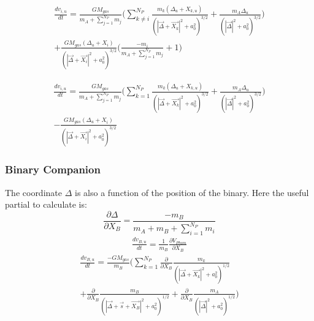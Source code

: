 \documentclass{aastex631}
\begin{document}
\begin{equation}
    \begin{split}
      \frac{dv_{i,u}}{dt} = 
      \frac{GM_{gas}}{m_A+\sum_{j=1}^{N_P}m_j}\biggl(\sum_{k\neq i}^{N_P}\frac{m_k(\Delta_u+X_{k,u})}{(|\vec{\Delta}+\vec{X_k}|^2+a_0^2)^{3/2}}+ 
      \frac{m_A\Delta_u}{(|\vec{\Delta}|^2+a_0^2)^{3/2}} \biggr)\\+
       \frac{GM_{gas}(\Delta_u+X_i)}{(|\vec{\Delta}+\vec{X_i}|^2+a_0^2)^{3/2}}\biggl(\frac{-m_i}{m_A+\sum_{j=1}^{N_P}m_j}+1\biggr)
    \end{split}
\end{equation}


\begin{equation}
    \begin{split}
    \frac{dv_{i,u}}{dt} = 
    \frac{GM_{gas}}{m_A+\sum_{j=1}^{N_P}m_j}\biggl(\sum_{k=1}^{N_P}\frac{m_k(\Delta_u+X_{k,u})}{(|\vec{\Delta}+\vec{X_k}|^2+a_0^2)^{3/2}}+
    \frac{m_A\Delta_u}{(|\vec{\Delta}|^2+a_0^2)^{3/2}} \biggr)\\ - \frac{GM_{gas}(\Delta_u+X_i)}{(|\vec{\Delta}+\vec{X_i}|^2+a_0^2)^{3/2}}   
    \end{split}
\end{equation}

\subsubsection{Binary Companion}
The coordinate $\Delta$ is also a function of the position of the binary. Here the useful partial to calculate is:
\begin{equation}
    \frac{\partial \Delta}{\partial X_B} = \frac{-m_B}{m_A+m_B+\sum_{i=1}^{N_P}m_i}
\end{equation}
\begin{equation}
    \begin{split}
        \frac{dv_{B,u}}{dt}=\frac{1}{m_B}\frac{\partial V_{Plum}}{\partial X_{B}}
\end{split}
\end{equation}
\begin{equation}
    \begin{split}
        \frac{dv_{B,u}}{dt}=\frac{-GM_{gas}}{m_B}\biggl(\sum_{k=1}^{N_P}\frac{\partial}{\partial X_{B}}\frac{m_k}{(|\vec{\Delta}+\vec{X_k}|^2+a_0^2)^{1/2}} \\
        +\frac{\partial}{\partial X_B}\frac{m_B}{(|\vec{\Delta}+\vec{s}+\vec{X_B}|^2+a_0^2)^{1/2}}+\frac{\partial}{\partial X_{B}}\frac{m_A}{(|\vec{\Delta}|^2+a_0^2)^{1/2}} \biggr)
    \end{split}
\end{equation}
\end{document}
